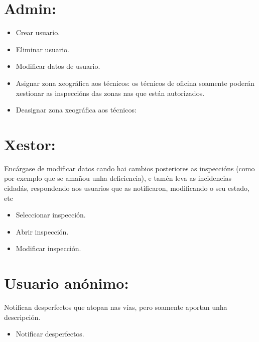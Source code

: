 \documentclass[a4paper,10pt]{article}
\begin{document}
\section{Admin:}
\begin{itemize}
 \item Crear usuario.
 \item Eliminar usuario.
 \item Modificar datos de usuario.
 \item Asignar zona xeográfica aos técnicos: os técnicos de oficina soamente poderán xestionar as inspeccións das zonas nas que están autorizados.
 \item Deasignar zona xeográfica aos técnicos:
 \end{itemize}



\section{Xestor:}Encárgase de modificar datos cando hai cambios posteriores as inspeccións (como por exemplo que se amañou unha deficiencia), 
e tamén leva as incidencias cidadás, respondendo aos usuarios que as notificaron, modificando o seu estado, etc
\begin{itemize} 
 \item Seleccionar inspección.
 \item Abrir inspección.
 \item Modificar inspección.

\end{itemize}



\section{Usuario anónimo:}Notifican desperfectos que atopan nas vías, pero soamente aportan unha descripción.
\begin{itemize}
 \item Notificar desperfectos.
\end{itemize}
\end{document}
